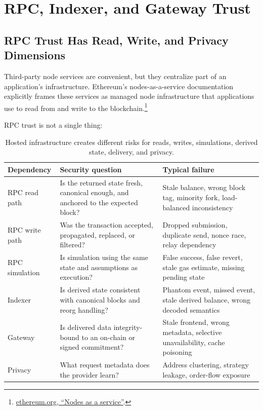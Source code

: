 \section{RPC, Indexer, and Gateway Trust}

\subsection{RPC Trust Has Read, Write, and Privacy Dimensions}

Third-party node services are convenient, but they centralize part of an application's infrastructure. Ethereum's nodes-as-a-service documentation explicitly frames these services as managed node infrastructure that applications use to read from and write to the blockchain.\footnote{\href{https://ethereum.org/developers/docs/nodes-and-clients/nodes-as-a-service/}{ethereum.org, ``Nodes as a service''}.}

RPC trust is not a single thing:

\begin{table}[htbp]
\centering
\small
\renewcommand{\arraystretch}{1.16}
\begin{tabularx}{\textwidth}{@{}>{\RaggedRight\arraybackslash}p{}>{\RaggedRight\arraybackslash}p{}X@{}}
\toprule
Dependency & Security question & Typical failure \\
\midrule
RPC read path & Is the returned state fresh, canonical enough, and anchored to the expected block? & Stale balance, wrong block tag, minority fork, load-balanced inconsistency \\
RPC write path & Was the transaction accepted, propagated, replaced, or filtered? & Dropped submission, duplicate send, nonce race, relay dependency \\
RPC simulation & Is simulation using the same state and assumptions as execution? & False success, false revert, stale gas estimate, missing pending state \\
Indexer & Is derived state consistent with canonical blocks and reorg handling? & Phantom event, missed event, stale derived balance, wrong decoded semantics \\
Gateway & Is delivered data integrity-bound to an on-chain or signed commitment? & Stale frontend, wrong metadata, selective unavailability, cache poisoning \\
Privacy & What request metadata does the provider learn? & Address clustering, strategy leakage, order-flow exposure \\
\bottomrule
\end{tabularx}
\caption{Hosted infrastructure creates different risks for reads, writes, simulations, derived state, delivery, and privacy.}
\end{table}

